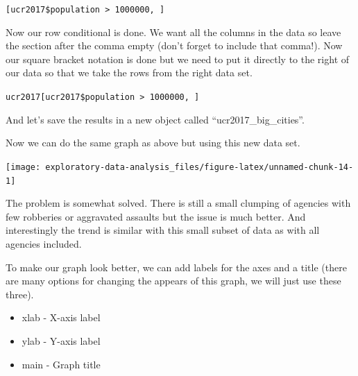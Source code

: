 \documentclass[
  12pt,
]{book}
\newenvironment{Shaded}{\begin{snugshade}}{\end{snugshade}}
\newcommand{\DecValTok}[1]{\textcolor[rgb]{0.00,0.00,0.81}{#1}}
\newcommand{\KeywordTok}[1]{\textcolor[rgb]{0.13,0.29,0.53}{\textbf{#1}}}
\newcommand{\NormalTok}[1]{#1}
\newcommand{\OperatorTok}[1]{\textcolor[rgb]{0.81,0.36,0.00}{\textbf{#1}}}
\newcommand{\StringTok}[1]{\textcolor[rgb]{0.31,0.60,0.02}{#1}}
\providecommand{\tightlist}{%
  \setlength{\itemsep}{0pt}\setlength{\parskip}{0pt}}
\begin{document}
\texttt{{[}ucr2017\$population\ \textgreater{}\ 1000000,\ {]}}

Now our row conditional is done. We want all the columns in the data so leave the section after the comma empty (don't forget to include that comma!). Now our square bracket notation is done but we need to put it directly to the right of our data so that we take the rows from the right data set.

\texttt{ucr2017{[}ucr2017\$population\ \textgreater{}\ 1000000,\ {]}}

And let's save the results in a new object called ``ucr2017\_big\_cities''.

\begin{Shaded}
\end{Shaded}

Now we can do the same graph as above but using this new data set.

\begin{Shaded}
\end{Shaded}

\begin{center}\texttt{[image: exploratory-data-analysis\_files/figure-latex/unnamed-chunk-14-1]} \end{center}

The problem is somewhat solved. There is still a small clumping of agencies with few robberies or aggravated assaults but the issue is much better. And interestingly the trend is similar with this small subset of data as with all agencies included.

To make our graph look better, we can add labels for the axes and a title (there are many options for changing the appears of this graph, we will just use these three).

\begin{itemize}
\tightlist
\item
  xlab - X-axis label
\item
  ylab - Y-axis label
\item
  main - Graph title
\end{itemize}
\end{document}

